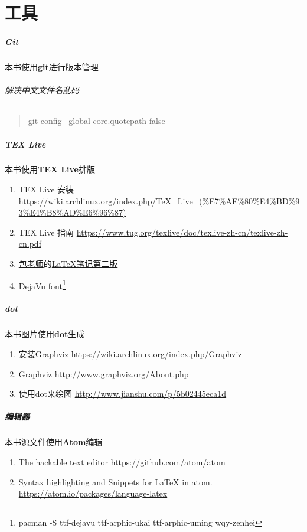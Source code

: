 \chapter{工具}

\paragraph{Git}
本书使用\textbf{git}进行版本管理
\subparagraph{解决中文文件名乱码}
\begin{quote}
  git config --global core.quotepath false
\end{quote}


\paragraph{TEX Live}
本书使用\textbf{TEX Live}排版
\begin{enumerate}
  \item TEX Live 安装 \url{https://wiki.archlinux.org/index.php/TeX_Live_(%E7%AE%80%E4%BD%93%E4%B8%AD%E6%96%87)}
  \item TEX Live 指南 \url{https://www.tug.org/texlive/doc/texlive-zh-cn/texlive-zh-cn.pdf}
  \item \href{http://www.dralpha.com/zh/index.htm}{包老师}的\href{http://dralpha.altervista.org/zh/tech/lnotes2.pdf}{LaTeX笔记第二版}
  \item DejaVu font\footnote{pacman -S ttf-dejavu ttf-arphic-ukai ttf-arphic-uming wqy-zenhei}
\end{enumerate}

\paragraph{dot}
本书图片使用\textbf{dot}生成
\begin{enumerate}
  \item 安装Graphviz \url{https://wiki.archlinux.org/index.php/Graphviz}
  \item Graphviz \url{http://www.graphviz.org/About.php}
  \item 使用dot来绘图 \url{http://www.jianshu.com/p/5b02445eca1d}
\end{enumerate}

\paragraph{编辑器}
本书源文件使用\textbf{Atom}编辑
\begin{enumerate}
  \item The hackable text editor \url{https://github.com/atom/atom}
  \item Syntax highlighting and Snippets for LaTeX in atom. \url{https://atom.io/packages/language-latex}
\end{enumerate}

